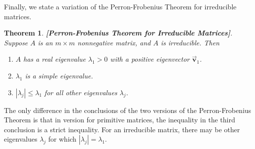 \documentclass[reqno]{immbook}
\newcommand{\BV}{\vec{\textbf{v}}}
\numberwithin{equation}{chapter}
\newtheorem{theorem}{Theorem}
\numberwithin{question}{section}
\numberwithin{theorem}{chapter}
\numberwithin{figure}{chapter}
\theoremstyle{definition}
\begin{document}
Finally, we state a variation of the Perron-Frobenius Theorem
for irreducible matrices.
\begin{theorem}
\textrm{\textbf{[Perron-Frobenius Theorem for Irreducible Matrices]}}.
Suppose $A$ is an $m\times m$ nonnegative matrix, and $A$ is irreducible.
Then
\begin{enumerate}
\item $A$ has a real eigenvalue $\lambda_1>0$ with 
a positive eigenvector $\BV_1$.
\item $\lambda_1$ is a simple eigenvalue.
\item $|\lambda_j| \le \lambda_1$ for all other eigenvalues
$\lambda_j$.
\end{enumerate}
\end{theorem}


The only difference in the conclusions of the two versions
of the Perron-Frobenius Theorem
is that in version for primitive matrices, the inequality in the third
conclusion is a strict inequality.
For an irreducible matrix, there may be other eigenvalues $\lambda_j$
for which $|\lambda_j| = \lambda_1$.
\end{document}
